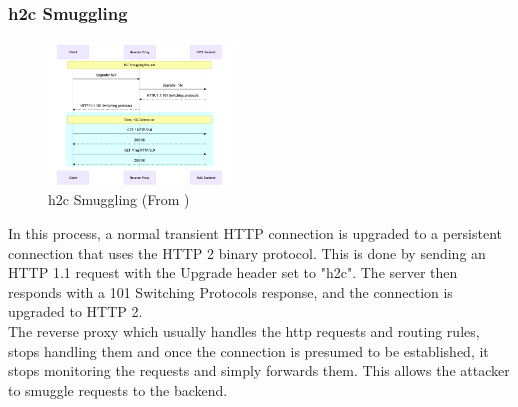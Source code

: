 \documentclass[conference]{IEEEtran}
\begin{document}
\begin{enumerate}
\subsubsection*{h2c Smuggling}
\begin{figure}[h]
	\centering
	\includegraphics[width=0.45\textwidth]{results/h2c_smuggling_flow.png}
	\caption{h2c Smuggling (From \cite{reference4})}
	\label{fig:smuggling}
\end{figure}
In this process, a normal transient HTTP connection is upgraded to a persistent connection that uses the HTTP 2 binary protocol. This is done by sending an HTTP 1.1 request with the Upgrade header set to "h2c". The server then responds with a 101 Switching Protocols response, and the connection is upgraded to HTTP 2. \\
The reverse proxy which usually handles the http requests and routing rules, stops handling them and once the connection is presumed to be established, it stops monitoring the requests and simply forwards them. This allows the attacker to smuggle requests to the backend. \\
\end{enumerate}
\end{document}
